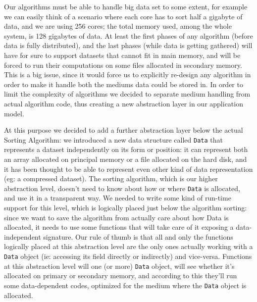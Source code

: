 \label{DAL}
Our algorithms must be able to handle big data set to some extent, for example we can easily think of a scenario where each core has to sort half a gigabyte of data, and we are using 256 cores; the total memory used, among the whole system, is 128 gigabytes of data.
At least the first phases of any algorithm (before data is fully distributed), and the last phases (while data is getting gathered) will have for sure to support datasets that cannot fit in main memory, and will be forced to run their computations on some files allocated in secondary memory.
This is a big issue, since it would force us to explicitly re-design any algorithm in order to make it handle both the mediums data could be stored in.
In order to limit the complexity of algorithms we decided to separate medium handling from actual algorithm code, thus creating a new abstraction layer in our application model.

At this purpose we decided to add a further abstraction layer below the actual Sorting Algorithm: we introduced a new data structure called \texttt{Data} that represents a dataset independently on its form or position: it can represent both an array allocated on principal memory or a file allocated on the hard disk, and it has been thought to be able to represent even other kind of data representation (eg: a compressed dataset). The sorting algorithm, which is our higher abstraction level, doesn't need to know about how or where \texttt{Data} is allocated, and use it in a transparent way.
We needed to write some kind of run-time support for this level, which is logically placed just below the algorithm sorting: since we want to save the algorithm from actually care about how Data is allocated, it needs to use some functions that will take care of it exposing a data-independent signature. Our rule of thumb is that all and only the functions logically placed at this abstraction level are the only ones actually working with a \texttt{Data} object (ie: accessing its field directly or indirectly) and vice-versa.
Functions at this abstraction level will one (or more) \texttt{Data} object, will see whether it's allocated on primary or secondary memory, and according to this they'll run some data-dependent codes, optimized for the medium where the \texttt{Data} object is allocated.

